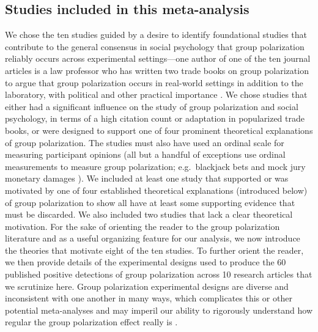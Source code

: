\documentclass[
  abstract]{article}
\begin{document}
\subsection{Studies included in this
meta-analysis}\label{studies-included-in-this-meta-analysis}

We chose the ten studies guided by a desire to identify foundational
studies that contribute to the general consensus in social psychology
that group polarization reliably occurs across experimental
settings---one author of one of the ten journal articles is a law
professor who has written two trade books on group polarization to argue
that group polarization occurs in real-world settings in addition to the
laboratory, with political and other practical importance
\autocite{Sunstein2009,Sunstein2019}. We chose studies that either had a
significant influence on the study of group polarization and social
psychology, in terms of a high citation count or adaptation in
popularized trade books, or were designed to support one of four
prominent theoretical explanations of group polarization. The studies
must also have used an ordinal scale for measuring participant opinions
(all but a handful of exceptions use ordinal measurements to measure
group polarization; e.g.~blackjack bets
\autocite{Blascovich1973,Blascovich1976} and mock jury monetary damages
\autocite{Schkade2000}). We included at least one study that supported
or was motivated by one of four established theoretical explanations
(introduced below) of group polarization to show all have at least some
supporting evidence that must be discarded. We also included two studies
that lack a clear theoretical motivation. For the sake of orienting the
reader to the group polarization literature and as a useful organizing
feature for our analysis, we now introduce the theories that motivate
eight of the ten studies. To further orient the reader, we then provide
details of the experimental designs used to produce the 60 published
positive detections of group polarization across 10 research articles
that we scrutinize here. Group polarization experimental designs are
diverse and inconsistent with one another in many ways, which
complicates this or other potential meta-analyses and may imperil our
ability to rigorously understand how regular the group polarization
effect really is \autocite{Yarkoni2022,Almaatouq2022}.
\end{document}
